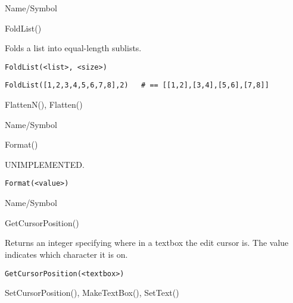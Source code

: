 \rl


\begin{desc}{Name/Symbol}
\item[Name/Symbol]	FoldList()

\item[Description]	Folds a list into equal-length sublists.

\item[Usage]
\begin{verbatim}
FoldList(<list>, <size>)
\end{verbatim}

\item[Example]
\begin{verbatim}
FoldList([1,2,3,4,5,6,7,8],2)	# == [[1,2],[3,4],[5,6],[7,8]]
\end{verbatim}
 
\item[See Also]	FlattenN(), Flatten()
\end{desc}

\rl



\begin{desc}{Name/Symbol}
\item[Name/Symbol]	Format()            

\item[Description]	UNIMPLEMENTED.

\item[Usage]
\begin{verbatim}
Format(<value>)
\end{verbatim}

\item[Example]	

\item[See Also]	
\end{desc}

\rl


\begin{desc}{Name/Symbol}
\item[Name/Symbol]	GetCursorPosition()

\item[Description]	Returns an integer specifying where in a textbox the edit cursor is.  The value indicates which character it is on.

\item[Usage]
\begin{verbatim}
GetCursorPosition(<textbox>)
\end{verbatim}

\item[Example]	

\item[See Also]	SetCursorPosition(), MakeTextBox(), SetText()
\end{desc}

